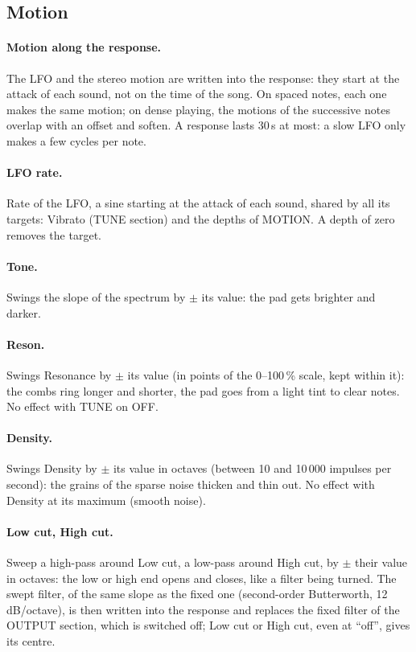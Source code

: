 \documentclass[a4paper,11pt]{article}
\newcommand{\dB}{\,dB}
\begin{document}
\subsection{Motion}\label{sec:lfo}

\paragraph{Motion along the response.} The LFO and the stereo motion are written into the
response: they start at the attack of each sound, not on the time of the song. On spaced
notes, each one makes the same motion; on dense playing, the motions of the successive notes
overlap with an offset and soften. A response lasts 30\,s at most: a slow LFO only makes a few cycles
per note.

\paragraph{LFO rate.} Rate of the LFO, a sine starting at the attack of each sound, shared by all
its targets: Vibrato (TUNE section) and the depths of MOTION. A depth of zero removes the target.

\paragraph{Tone.} Swings the slope of the spectrum by $\pm$ its value: the pad gets brighter and
darker.

\paragraph{Reson.} Swings Resonance by $\pm$ its value (in points of the 0--100\,\% scale, kept within
it): the combs ring longer and shorter, the pad goes from a light tint to clear notes. No effect
with TUNE on OFF.

\paragraph{Density.} Swings Density by $\pm$ its value in octaves (between 10 and 10\,000 impulses
per second): the grains of the sparse noise thicken and thin out. No effect with Density at its
maximum (smooth noise).

\paragraph{Low cut, High cut.} Sweep a high-pass around Low cut, a low-pass around High cut, by
$\pm$ their value in octaves: the low or high end opens and closes, like a filter being turned.
The swept filter, of the same slope as the fixed one (second-order Butterworth, 12\dB/octave), is
then written into the response and replaces the fixed filter of the OUTPUT section, which is
switched off; Low cut or High cut, even at ``off'', gives its centre.
\end{document}
